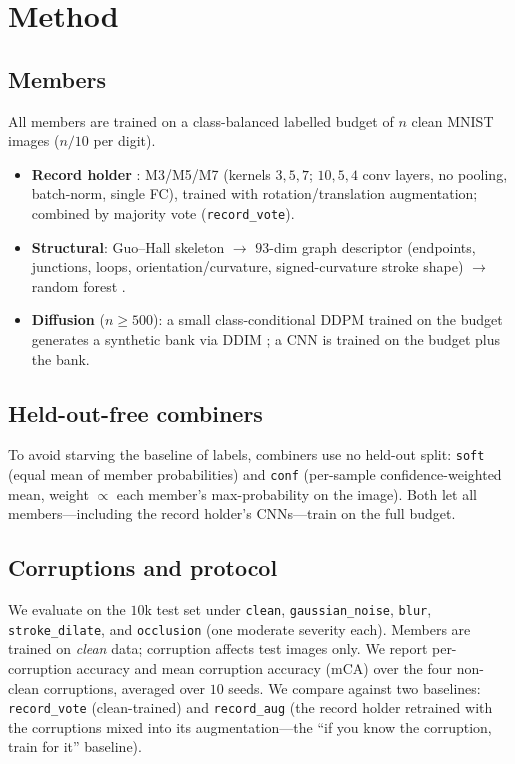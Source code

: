 \documentclass[conference]{IEEEtran}
\begin{document}
\section{Method}
\subsection{Members}
All members are trained on a class-balanced labelled budget of $n$ clean MNIST images
($n/10$ per digit).
\begin{itemize}
  \item \textbf{Record holder} \cite{An2020}: M3/M5/M7 (kernels $3,5,7$; $10,5,4$ conv layers,
        no pooling, batch-norm, single FC), trained with rotation/translation augmentation;
        combined by majority vote (\texttt{record\_vote}).
  \item \textbf{Structural}: Guo--Hall skeleton \cite{GuoHall1989} $\rightarrow$ $93$-dim
        graph descriptor (endpoints, junctions, loops, orientation/curvature, signed-curvature
        stroke shape) $\rightarrow$ random forest \cite{Breiman2001}.
  \item \textbf{Diffusion} ($n\!\geq\!500$): a small class-conditional DDPM \cite{Ho2020}
        trained on the budget generates a synthetic bank via DDIM \cite{Song2021}; a CNN is
        trained on the budget plus the bank.
\end{itemize}

\subsection{Held-out-free combiners}
To avoid starving the baseline of labels, combiners use no held-out split: \texttt{soft}
(equal mean of member probabilities) and \texttt{conf} (per-sample confidence-weighted mean,
weight $\propto$ each member's max-probability on the image). Both let all members---including
the record holder's CNNs---train on the full budget.

\subsection{Corruptions and protocol}
We evaluate on the $10$k test set under \texttt{clean}, \texttt{gaussian\_noise},
\texttt{blur}, \texttt{stroke\_dilate}, and \texttt{occlusion} (one moderate severity each).
Members are trained on \emph{clean} data; corruption affects test images only. We report
per-corruption accuracy and mean corruption accuracy (mCA) over the four non-clean
corruptions, averaged over $10$ seeds. We compare against two baselines: \texttt{record\_vote}
(clean-trained) and \texttt{record\_aug} (the record holder retrained with the corruptions
mixed into its augmentation---the ``if you know the corruption, train for it'' baseline).
\end{document}
